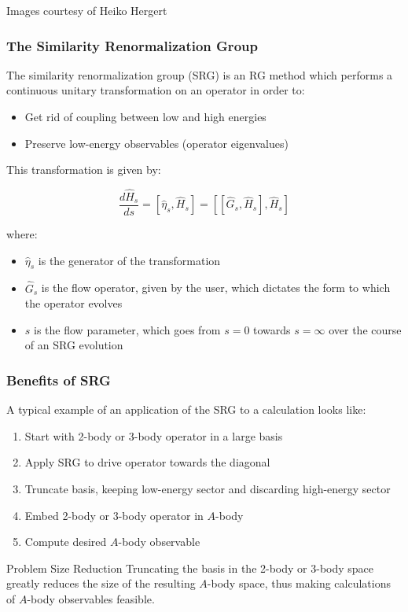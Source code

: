 \documentclass{beamer}
\begin{document}
{\begin{frame}
\begin{center}
\tiny Images courtesy of Heiko Hergert
\end{center}
\end{frame}


\begin{frame}
\frametitle{The Similarity Renormalization Group}
The similarity renormalization group (SRG) is an RG method which performs a continuous unitary transformation on an operator in order to:
\begin{itemize}
    \item Get rid of coupling between low and high energies
    \item Preserve low-energy observables (operator eigenvalues)
\end{itemize}
\pause

This transformation is given by:

\begin{equation}
\frac{d\hat{H}_s}{ds} = [\hat{\eta}_s, \hat{H}_s] = [[\hat{G}_s, \hat{H}_s], \hat{H}_s]
\end{equation}

where:\pause
\begin{itemize}
    \item $\hat{\eta}_s$ is the generator of the transformation\pause
    \item $\hat{G}_s$ is the flow operator, given by the user, which dictates the form to which the operator evolves\pause
    \item $s$ is the flow parameter, which goes from $s=0$ towards $s=\infty$ over the course of an SRG evolution
\end{itemize}
\end{frame}

\begin{frame}
\frametitle{Benefits of SRG}
A typical example of an application of the SRG to a calculation looks like:
\begin{enumerate}
    \item Start with 2-body or 3-body operator in a large basis
    \item Apply SRG to drive operator towards the diagonal
    \item Truncate basis, keeping low-energy sector and discarding high-energy sector
    \item Embed 2-body or 3-body operator in $A$-body
    \item Compute desired $A$-body observable
\end{enumerate}
\pause
\begin{alertblock}{Problem Size Reduction}
Truncating the basis in the 2-body or 3-body space greatly reduces the size of the resulting $A$-body space, thus making calculations of $A$-body observables feasible.
\end{alertblock}
\end{frame}


}
\end{document}
